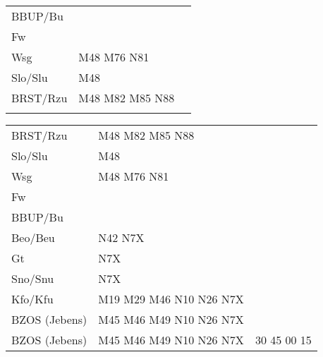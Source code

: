 \begin{tabular}{!{\color{schiefergrau}\vrule width 3pt}*{3}{l!{\color{schiefergrau}\vrule width 3pt}}}
BBUP/Bu      &                                                                       & \\
Fw           &                                                                       & \\
Wsg          & \mbus{} M48 M76 \nbus{} N81                                           & \\
Slo/Slu      & \mbus{} M48                                                           & \\
BRST/Rzu     & \mbus{} M48 M82 M85 \nbus{} N88                                       & \\
\myhline
\end{tabular}

\begin{tabular}{!{\color{schiefergrau}\vrule width 3pt}*{3}{l!{\color{schiefergrau}\vrule width 3pt}}}
\hline
{}
 \\
\hline
BRST/Rzu     & \mbus{} M48 M82 M85 \nbus{} N88                                       & \\
Slo/Slu      & \mbus{} M48                                                           & \\
Wsg          & \mbus{} M48 M76 \nbus{} N81                                           & \\
Fw           &                                                                       & \\
BBUP/Bu      &                                                                       & \\
Beo/Beu      & \nusieben{} \nbus{} N42 N7X                                           & \\
Gt           & N7X                                                                   & \\
Sno/Snu      & \nudrei{} N7X                                                         & \\
Kfo/Kfu      & \nueins{} \nuzwei{} \nudrei{} \mbus{} M19 M29 M46 \nbus{} N10 N26 N7X & \\
BZOS (Jebens)& \nueins{} \nuzwei{} \mbus{} M45 M46 M49 \nbus{} N10 N26 N7X           & \\
\hline
BZOS (Jebens)& \nueins{} \nuzwei{} \mbus{} M45 M46 M49 \nbus{} N10 N26 N7X           & 30 45 00 15 \\

\end{tabular}
